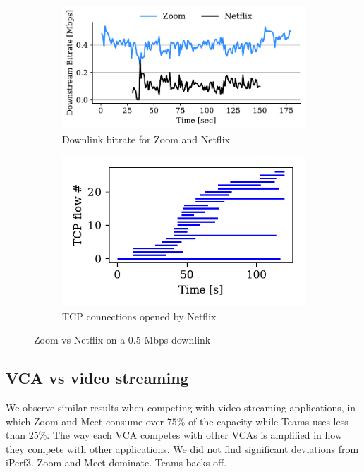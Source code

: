 \begin{figure}[t!]
\centering
\begin{subfigure}[t]{.4\textwidth}
    \centering
    \includegraphics[width=1\textwidth]{figures/comp_ts/zoom_netflix_0.5_dl_r1.pdf}
    \caption{Downlink bitrate for Zoom and Netflix}
    \label{fig:comp_zoom_netflix_bitrate}
\end{subfigure}\hfill
\begin{subfigure}[t]{.4\textwidth}
    \centering
    \includegraphics[width=1\textwidth]{figures/comp/netflix_connection_0_5.pdf}
    \caption{TCP connections opened by Netflix}
    \label{subfig:comp_netflix_conn}
\end{subfigure}
\caption{Zoom vs Netflix on a 0.5 Mbps downlink}
\label{fig:comp_netflix_zoom}
\end{figure}
\subsection{VCA vs video streaming}
We observe similar results when competing with video streaming applications, in which Zoom and Meet consume over $75\%$ of the capacity while Teams uses less than $25\%$. 
The way each VCA competes with other VCAs is amplified in how they compete with other applications. We did not find significant deviations from iPerf3. Zoom and Meet dominate. Teams backs off. 

